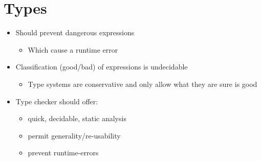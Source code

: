 
\section{Types}
\begin{itemize}
    \item Should prevent dangerous expressions
        \begin{itemize}
            \item Which cause a runtime error
        \end{itemize}
    \item Classification (good/bad) of expressions is undecidable
        \begin{itemize}
            \item Type systems are conservative and only allow what they are sure is good
        \end{itemize}
    \item Type checker should offer:
        \begin{itemize}
            \item quick, decidable, static analysis
            \item permit generality/re-usability
            \item prevent runtime-errors
        \end{itemize}
\end{itemize}

